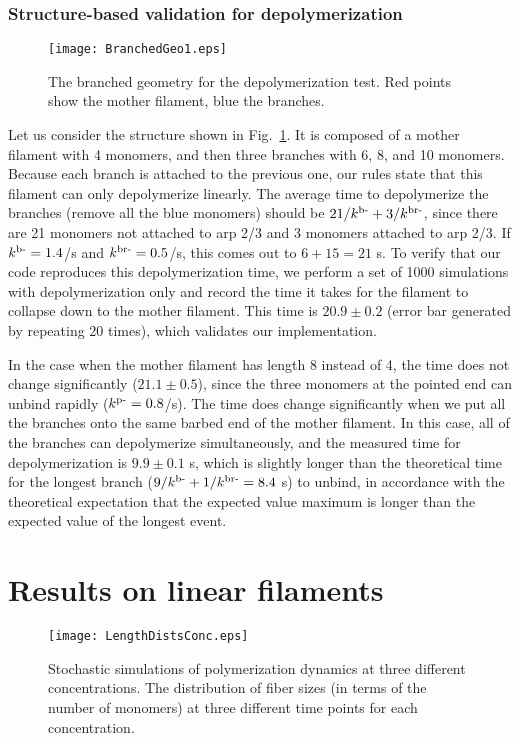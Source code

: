 \documentclass[11pt]{article}
\begin{document}
\begin{appendices}
\subsubsection{Structure-based validation for depolymerization}
\begin{figure}
\centering
\texttt{[image: BranchedGeo1.eps]}
\caption{\label{fig:BranchedGeo}The branched geometry for the depolymerization test. Red points show the mother filament, blue the branches.}
\end{figure}

Let us consider the structure shown in Fig.\ \ref{fig:BranchedGeo}. It is composed of a mother filament with 4 monomers, and then three branches with 6, 8, and 10 monomers. Because each branch is attached to the previous one, our rules state that this filament can only depolymerize linearly. The average time to depolymerize the branches (remove all the blue monomers) should be $21/k^\text{b-}+3/k^\text{br-}$, since there are 21 monomers not attached to arp 2/3 and 3 monomers attached to arp 2/3. If $k^\text{b-}=1.4$/s and $k^\text{br-}=0.5$/s, this comes out to $6+15=21$ s. To verify that our code reproduces this depolymerization time, we perform a set of 1000 simulations with depolymerization only and record the time it takes for the filament to collapse down to the mother filament. This time is $20.9 \pm 0.2$ (error bar generated by repeating 20 times), which validates our implementation. 

In the case when the mother filament has length 8 instead of 4, the time does not change significantly ($21.1 \pm 0.5$), since the three monomers at the pointed end can unbind rapidly ($k^\text{p-}=0.8$/s). The time does change significantly when we put all the branches onto the same barbed end of the mother filament. In this case, all of the branches can depolymerize simultaneously, and the measured time for depolymerization is $9.9 \pm 0.1$ s, which is slightly longer than the theoretical time for the longest branch ($9/k^\text{b-}+1/k^\text{br-}=8.4$ s) to unbind, in accordance with the theoretical expectation that the expected value maximum is longer than the expected value of the longest event.

\section{Results on linear filaments}
\begin{figure}
\texttt{[image: LengthDistsConc.eps]}
\caption{\label{fig:FibSizesSA}Stochastic simulations of polymerization dynamics at three different concentrations. The distribution of fiber sizes (in terms of the number of monomers) at three different time points for each concentration.}
\end{figure}


\end{appendices}
\end{document}
